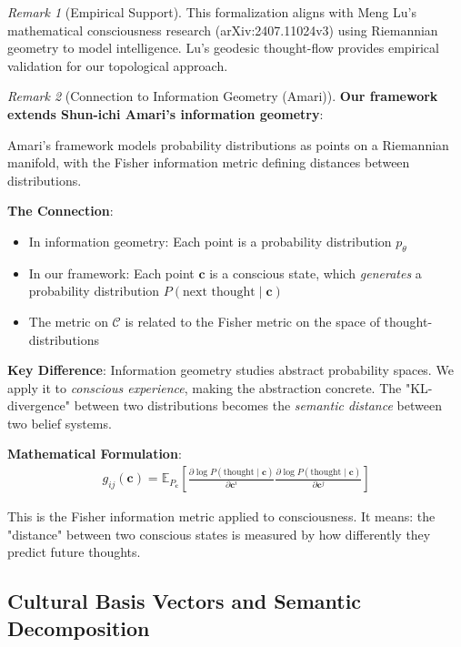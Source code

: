 \documentclass[11pt,a4paper]{article}
\theoremstyle{definition}
\theoremstyle{remark}
\newtheorem{remark}{Remark}[section]
\newcommand{\CC}{\mathcal{C}}
\newcommand{\cc}{\mathbf{c}}
\begin{document}
\begin{remark}[Empirical Support]
This formalization aligns with Meng Lu's mathematical consciousness research (arXiv:2407.11024v3) using Riemannian geometry to model intelligence. Lu's geodesic thought-flow provides empirical validation for our topological approach.
\end{remark}

\begin{remark}[Connection to Information Geometry (Amari)]
\textbf{Our framework extends Shun-ichi Amari's information geometry}:

Amari's framework models probability distributions as points on a Riemannian manifold, with the Fisher information metric defining distances between distributions. 

\textbf{The Connection}:
\begin{itemize}
    \item In information geometry: Each point is a probability distribution \(p_\theta\)
    \item In our framework: Each point \(\cc\) is a conscious state, which \textit{generates} a probability distribution \(P(\text{next thought} \mid \cc)\)
    \item The metric on \(\CC\) is related to the Fisher metric on the space of thought-distributions
\end{itemize}

\textbf{Key Difference}: Information geometry studies abstract probability spaces. We apply it to \textit{conscious experience}, making the abstraction concrete. The "KL-divergence" between two distributions becomes the \textit{semantic distance} between two belief systems.

\textbf{Mathematical Formulation}:
\begin{align}
g_{ij}(\cc) = \mathbb{E}_{P_\cc}\left[\frac{\partial \log P(\text{thought} \mid \cc)}{\partial \cc^i} \frac{\partial \log P(\text{thought} \mid \cc)}{\partial \cc^j}\right]
\end{align}

This is the Fisher information metric applied to consciousness. It means: the "distance" between two conscious states is measured by how differently they predict future thoughts.
\end{remark}

\subsection{Cultural Basis Vectors and Semantic Decomposition}
\end{document}
